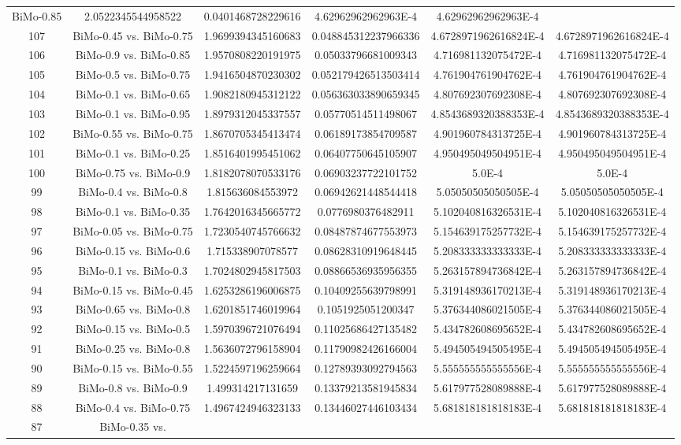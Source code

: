 \documentclass[a4paper,10pt]{article}
\begin{document}
\begin{landscape}
\begin{table}[!htp]
\begin{tabular}{cccccc}
BiMo-0.85&2.0522345544958522&0.0401468728229616&4.62962962962963E-4&4.62962962962963E-4\\107&BiMo-0.45 vs. BiMo-0.75&1.9699394345160683&0.048845312237966336&4.6728971962616824E-4&4.6728971962616824E-4\\106&BiMo-0.9 vs. BiMo-0.85&1.9570808220191975&0.05033796681009343&4.716981132075472E-4&4.716981132075472E-4\\105&BiMo-0.5 vs. BiMo-0.75&1.9416504870230302&0.052179426513503414&4.761904761904762E-4&4.761904761904762E-4\\104&BiMo-0.1 vs. BiMo-0.65&1.9082180945312122&0.056363033890659345&4.807692307692308E-4&4.807692307692308E-4\\103&BiMo-0.1 vs. BiMo-0.95&1.8979312045337557&0.05770514511498067&4.8543689320388353E-4&4.8543689320388353E-4\\102&BiMo-0.55 vs. BiMo-0.75&1.8670705345413474&0.06189173854709587&4.901960784313725E-4&4.901960784313725E-4\\101&BiMo-0.1 vs. BiMo-0.25&1.8516401995451062&0.06407750645105907&4.950495049504951E-4&4.950495049504951E-4\\100&BiMo-0.75 vs. BiMo-0.9&1.8182078070533176&0.06903237722101752&5.0E-4&5.0E-4\\99&BiMo-0.4 vs. BiMo-0.8&1.815636084553972&0.06942621448544418&5.05050505050505E-4&5.05050505050505E-4\\98&BiMo-0.1 vs. BiMo-0.35&1.7642016345665772&0.0776980376482911&5.102040816326531E-4&5.102040816326531E-4\\97&BiMo-0.05 vs. BiMo-0.75&1.7230540745766632&0.08487874677553973&5.154639175257732E-4&5.154639175257732E-4\\96&BiMo-0.15 vs. BiMo-0.6&1.715338907078577&0.08628310919648445&5.208333333333333E-4&5.208333333333333E-4\\95&BiMo-0.1 vs. BiMo-0.3&1.7024802945817503&0.08866536935956355&5.263157894736842E-4&5.263157894736842E-4\\94&BiMo-0.15 vs. BiMo-0.45&1.6253286196006875&0.10409255639798991&5.319148936170213E-4&5.319148936170213E-4\\93&BiMo-0.65 vs. BiMo-0.8&1.6201851746019964&0.1051925051200347&5.376344086021505E-4&5.376344086021505E-4\\92&BiMo-0.15 vs. BiMo-0.5&1.5970396721076494&0.11025686427135482&5.434782608695652E-4&5.434782608695652E-4\\91&BiMo-0.25 vs. BiMo-0.8&1.5636072796158904&0.11790982426166004&5.494505494505495E-4&5.494505494505495E-4\\90&BiMo-0.15 vs. BiMo-0.55&1.5224597196259664&0.12789393092794563&5.555555555555556E-4&5.555555555555556E-4\\89&BiMo-0.8 vs. BiMo-0.9&1.499314217131659&0.13379213581945834&5.617977528089888E-4&5.617977528089888E-4\\88&BiMo-0.4 vs. BiMo-0.75&1.4967424946323133&0.13446027446103434&5.681818181818183E-4&5.681818181818183E-4\\87&BiMo-0.35 vs. 
\end{tabular}
\end{table}
\end{landscape}
\end{document}
